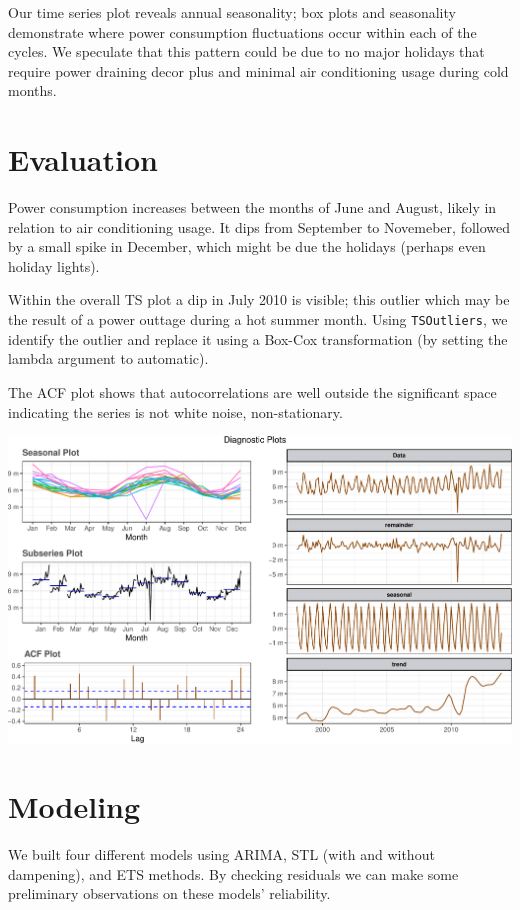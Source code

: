 \documentclass[openany]{book}
\begin{document}
Our time series plot reveals annual seasonality; box plots and
seasonality demonstrate where power consumption fluctuations occur
within each of the cycles. We speculate that this pattern could be due
to no major holidays that require power draining decor plus and minimal
air conditioning usage during cold months.

\hypertarget{evaluation-1}{%
\section{Evaluation}\label{evaluation-1}}

Power consumption increases between the months of June and August,
likely in relation to air conditioning usage. It dips from September to
Novemeber, followed by a small spike in December, which might be due the
holidays (perhaps even holiday lights).

Within the overall TS plot a dip in July 2010 is visible; this outlier
which may be the result of a power outtage during a hot summer month.
Using \texttt{TSOutliers}, we identify the outlier and replace it using
a Box-Cox transformation (by setting the lambda argument to automatic).

The ACF plot shows that autocorrelations are well outside the
significant space indicating the series is not white noise,
non-stationary.

\includegraphics{Group2_Project1_Fall2019_files/figure-latex/unnamed-chunk-9-1.pdf}

\hypertarget{modeling-1}{%
\section{Modeling}\label{modeling-1}}

We built four different models using ARIMA, STL (with and without
dampening), and ETS methods. By checking residuals we can make some
preliminary observations on these models' reliability.
\end{document}

